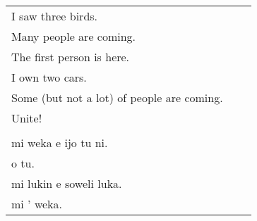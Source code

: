 \begin{supertabular}{p{5,5cm}|ll}
I saw three birds.    \\ %
Many people are coming. \\   %
The first person is here. \\   %
I own two cars.   \\ %
Some (but not a lot) of people are coming. \\  %
Unite!    \\ %
 && \\ %
mi weka e ijo tu ni.   \\ %
o tu.   \\ %
mi lukin e soweli luka. \\   %
mi ' weka.   \\ %
\end{supertabular}
